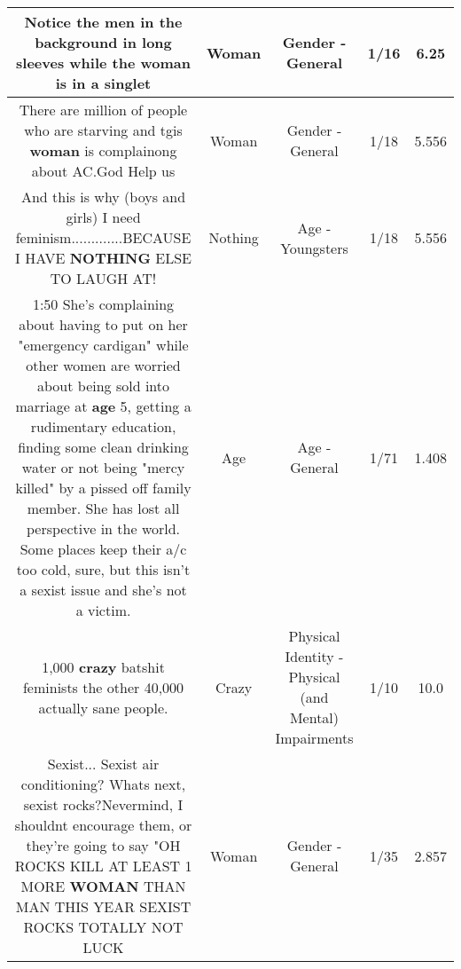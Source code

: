 \documentclass[11pt]{article}
\newlength\mylength
\begin{document}
\begin{center}
\begin{longtable}{|C{.65\mylength}|C{.30\mylength}|C{.12\mylength}|C{.12\mylength}|C{.12\mylength}|}
  \small Notice the men in the background in long sleeves while the \textbf{woman} is in a singlet\normalsize   & Woman & Gender - General & 1/16 & 6.25 \\  \hline
  \small There are million of people who are starving and tgis \textbf{woman} is complainong about AC.God Help us\normalsize   & Woman & Gender - General & 1/18 & 5.556 \\  \hline
  \small And this is why (boys and girls) I need feminism.............BECAUSE I HAVE \textbf{NOTHING} ELSE TO LAUGH AT!\normalsize   & Nothing & Age - Youngsters & 1/18 & 5.556 \\  \hline
  \small 1:50 She's complaining about having to put on her "emergency cardigan" while other women are worried about being sold into marriage at \textbf{age} 5, getting a rudimentary education, finding some clean drinking water or not being "mercy killed" by a pissed off family member.  She has lost all perspective in the world.  Some places keep their a/c too cold, sure, but this isn't a sexist issue and she's not a victim.\normalsize   & Age & Age - General & 1/71 & 1.408 \\  \hline
  \small 1,000 \textbf{crazy} batshit feminists the other 40,000 actually sane people.\normalsize   & Crazy & Physical Identity - Physical (and Mental) Impairments & 1/10 & 10.0 \\  \hline
  \small Sexist... Sexist air conditioning? Whats next, sexist rocks?Nevermind, I shouldnt encourage them, or they're going to say "OH ROCKS KILL AT LEAST 1 MORE \textbf{WOMAN} THAN MAN THIS YEAR SEXIST ROCKS TOTALLY NOT LUCK\normalsize   & Woman & Gender - General & 1/35 & 2.857 \\  \hline

\end{longtable}
\end{center}
\end{document}
